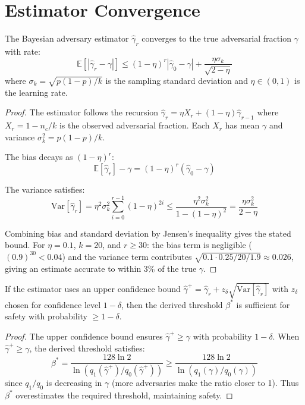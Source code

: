 \section{Estimator Convergence}

\label{sec:estimator}

\begin{theorem}
\label{thm:estimator}
The Bayesian adversary estimator $\hat{\gamma}_r$ converges to the true adversarial
fraction $\gamma$ with rate:
\[
\mathbb{E}[|\hat{\gamma}_r - \gamma|] \leq (1 - \eta)^r |\hat{\gamma}_0 - \gamma| + \frac{\eta \sigma_k}{\sqrt{2 - \eta}}
\]
where $\sigma_k = \sqrt{p(1-p)/k}$ is the sampling standard deviation and $\eta \in (0, 1)$
is the learning rate.
\end{theorem}

\begin{proof}
The estimator follows the recursion $\hat{\gamma}_r = \eta X_r + (1 - \eta)\hat{\gamma}_{r-1}$
where $X_r = 1 - n_c/k$ is the observed adversarial fraction. Each $X_r$ has mean $\gamma$
and variance $\sigma_k^2 = p(1-p)/k$.

The bias decays as $(1-\eta)^r$:
\[
\mathbb{E}[\hat{\gamma}_r] - \gamma = (1-\eta)^r(\hat{\gamma}_0 - \gamma)
\]

The variance satisfies:
\[
\text{Var}[\hat{\gamma}_r] = \eta^2 \sigma_k^2 \sum_{i=0}^{r-1} (1-\eta)^{2i}
\leq \frac{\eta^2 \sigma_k^2}{1 - (1-\eta)^2} = \frac{\eta \sigma_k^2}{2 - \eta}
\]

Combining bias and standard deviation by Jensen's inequality gives the stated bound.
For $\eta = 0.1$, $k = 20$, and $r \geq 30$: the bias term is negligible
($(0.9)^{30} < 0.04$) and the variance term contributes $\sqrt{0.1 \cdot 0.25/20 / 1.9} \approx 0.026$,
giving an estimate accurate to within 3\% of the true $\gamma$.
\end{proof}

\begin{lemma}
\label{lem:conservative}
If the estimator uses an upper confidence bound $\hat{\gamma}^+ = \hat{\gamma}_r + z_{\delta} \sqrt{\text{Var}[\hat{\gamma}_r]}$
with $z_\delta$ chosen for confidence level $1 - \delta$, then the derived threshold
$\beta^*$ is sufficient for safety with probability $\geq 1 - \delta$.
\end{lemma}

\begin{proof}
The upper confidence bound ensures $\hat{\gamma}^+ \geq \gamma$ with probability $1 - \delta$.
When $\hat{\gamma}^+ \geq \gamma$, the derived threshold satisfies:
\[
\beta^* = \frac{128 \ln 2}{\ln(q_1(\hat{\gamma}^+) / q_0(\hat{\gamma}^+))} \geq \frac{128 \ln 2}{\ln(q_1(\gamma) / q_0(\gamma))}
\]
since $q_1/q_0$ is decreasing in $\gamma$ (more adversaries make the ratio closer to 1).
Thus $\beta^*$ overestimates the required threshold, maintaining safety.
\end{proof}


